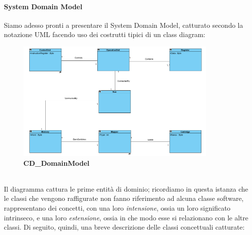 \documentclass[11pt]{article}
\begin{document}
\paragraph{System Domain Model} Siamo adesso pronti a presentare il System Domain Model, catturato secondo la notazione UML facendo uso dei costrutti tipici di un class diagram:
\begin{figure}[h]
\centering
\includegraphics[width=375px, height=225px]{CD_DomainModel.png}\\
\small\textbf{CD\_DomainModel}
\end{figure}\\
Il diagramma cattura le prime entità di dominio; ricordiamo in questa istanza che le classi che vengono raffigurate non fanno riferimento ad alcuna classe software, rappresentano dei concetti, con una loro \emph{intensione}, ossia un loro significato intrinseco, e una loro \emph{estensione}, ossia in che modo esse si relazionano con le altre classi. Di seguito, quindi, una breve descrizione delle classi concettuali catturate:
\end{document}
